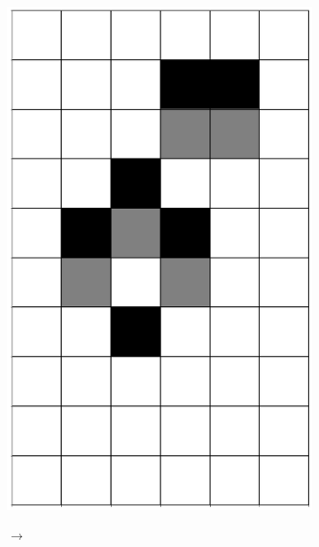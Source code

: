 \documentclass[12pt]{article}
\numberwithin{figure}{section} %
\begin{document}
\begin{figure}[H]
\begin{subfigure}{0.3\textwidth}
     		\includegraphics[angle=270,width=\linewidth]{Section4/3.2}
     		\subcaption{}
   	\end{subfigure}
   	\begin{subfigure}[t]{0.03\textwidth}
      		{\LARGE$\xrightarrow{}$}
   	\end{subfigure}
      	\newline
   	\setcounter{subfigure}{0}
   

\end{figure}
\end{document}
